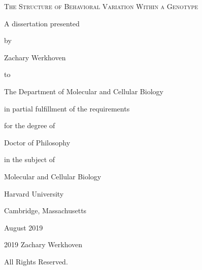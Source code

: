 \documentclass[12pt,letterpaper]{article}
\begin{document}
\vspace*{0.2in}


\begin{titlepage}
	\centering
	\vspace{1cm}
	{\scshape \large The Structure of Behavioral Variation Within a Genotype\par}
	\vspace{1.0cm}
	A dissertation presented\par \vspace{0.35cm}
	by\par \vspace{0.35cm}
	Zachary Werkhoven\par \vspace{0.35cm}
	to\par \vspace{0.35cm}
	The Department of Molecular and Cellular Biology\par \vspace{0.35cm}
	in partial fulfillment of the requirements\par \vspace{0.35cm}
	for the degree of\par \vspace{0.35cm}
	Doctor of Philosophy\par \vspace{0.35cm}
	in the subject of\par \vspace{0.35cm}
	Molecular and Cellular Biology\par \vspace{0.35cm}
	\vfill
	Harvard University\par
	Cambridge, Massachusetts\par
	August 2019
	\vfill
\end{titlepage}
\clearpage

\vspace*{\fill}
    \begin{center}
    \textcopyright \hspace{0.01in} 2019 Zachary Werkhoven
    \end{center}
    \begin{center}
    All Rights Reserved.
    \end{center}
    \thispagestyle{empty}       %
\vspace*{\fill}
\clearpage
\end{document}
